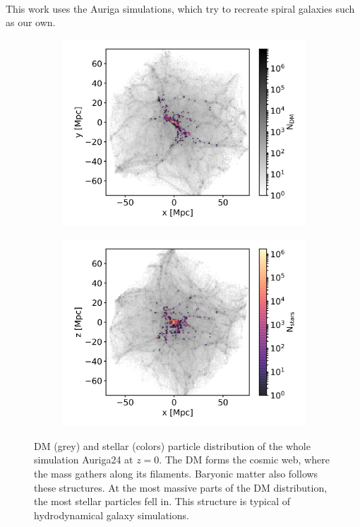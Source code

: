 \\This work uses the Auriga \citep{AurigaGrand} simulations, which try to recreate spiral galaxies such as our own. 
\begin{figure}[htbp]
\captionsetup{format=plain}
    \centering
    \begin{subfigure}[b]{0.8\textwidth}
	    \includegraphics[width=\textwidth]{plots/Auriga/DM_and_stars_xy_distribution.png}
	    \label{fig:DM_stars_xy}
    \end{subfigure}
    
    \begin{subfigure}[b]{0.8\textwidth}
    \centering
    	\includegraphics[width=\textwidth]{plots/Auriga/DM_and_stars_xz_distribution.png}
    	\label{fig:DM_stars_xy}
    \end{subfigure}
    \caption{\ac{DM} (grey) and stellar (colors) particle distribution of the whole simulation Auriga24 at $\textit{z}=0$. The \ac{DM} forms the cosmic web, where the mass gathers along its filaments. Baryonic matter also follows these structures. At the most massive parts of the \ac{DM} distribution, the most stellar particles fell in. This structure is typical of hydrodynamical galaxy simulations.}\label{fig:DM_stars_AU24}
\end{figure}
